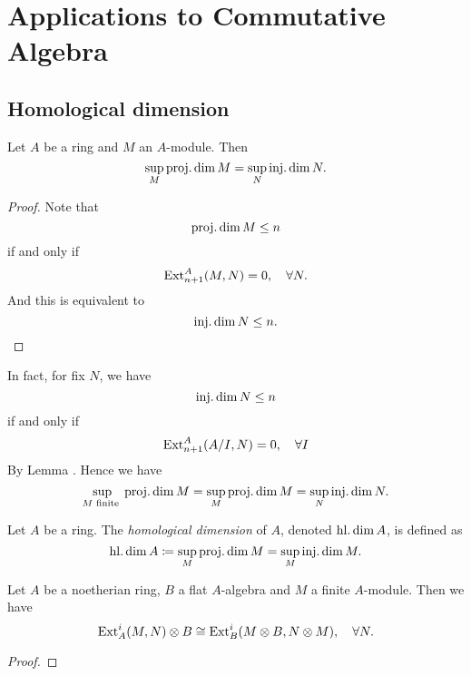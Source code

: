 \section{Applications to Commutative Algebra}


\subsection{Homological dimension}

    \begin{lemma}\label{lem: homological dimension is well-defined}
        Let \(A\) be a ring and \(M\) an \(A\)-module.
        Then 
        \[ \sup_{M} \operatorname{proj.dim} M = \sup_{N} \operatorname{inj.dim} N. \]
    \end{lemma}
    \begin{proof}
        Note that 
        \[ \operatorname{proj.dim} M \leq n \] 
        if and only if 
        \[ \operatorname{Ext}_{n+1}^A(M,N) = 0, \quad \forall N. \]
        And this is equivalent to
        \[ \operatorname{inj.dim} N \leq n. \]
    \end{proof}

    \begin{remark}\label{rmk: checking projective dimension of finite module is enough for homological dimension}
        In fact, for fix \(N\), we have 
        \[ \operatorname{inj.dim} N \leq n \]
        if and only if
        \[ \operatorname{Ext}_{n+1}^A(A/I,N) = 0, \quad \forall I \]
        By Lemma .
        Hence we have 
        \[ \sup_{M \text{ finite }} \operatorname{proj.dim} M = \sup_{M} \operatorname{proj.dim} M = \sup_{N} \operatorname{inj.dim} N. \]
    \end{remark}

    \begin{definition}\label{def: homological dimension}
        Let \(A\) be a ring.
        The \emph{homological dimension} of \(A\), denoted \(\operatorname{hl.dim} A\), is defined as
        \[ \operatorname{hl.dim} A \coloneqq \sup_{M} \operatorname{proj.dim} M = \sup_{M} \operatorname{inj.dim} M. \]
    \end{definition}

    \begin{lemma}\label{lem: Ext commute with flat tensor for finite module in first item}
        Let \(A\) be a noetherian ring, \(B\) a flat \(A\)-algebra and \(M\) a finite \(A\)-module.
        Then we have
        \[ \operatorname{Ext}^i_A(M,N)\otimes B \cong \operatorname{Ext}^i_B(M \otimes B, N \otimes M), \quad \forall N. \]
    \end{lemma}
    \begin{proof}
    \end{proof}


